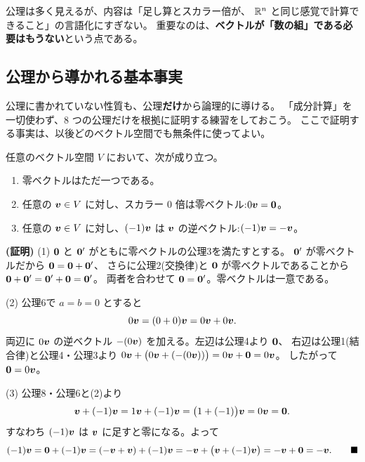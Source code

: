 公理は多く見えるが、内容は「足し算とスカラー倍が、
$\mathbb{R}^n$ と同じ感覚で計算できること」の言語化にすぎない。
重要なのは、\textbf{ベクトルが「数の組」である必要はもうない}という点である。

\subsection*{公理から導かれる基本事実}

公理に書かれていない性質も、公理\textbf{だけ}から論理的に導ける。
「成分計算」を一切使わず、$8$ つの公理だけを根拠に証明する練習をしておこう。
ここで証明する事実は、以後どのベクトル空間でも無条件に使ってよい。

\begin{teiri}[公理から導かれる基本事実]\label{thm:vs-basic}
任意のベクトル空間 $V$ において、次が成り立つ。
\begin{enumerate}
\item 零ベクトルはただ一つである。
\item 任意の $\bm{v} \in V$ に対し、スカラー $0$ 倍は零ベクトル:$0\bm{v} = \bm{0}$。
\item 任意の $\bm{v} \in V$ に対し、$(-1)\bm{v}$ は $\bm{v}$ の逆ベクトル:$(-1)\bm{v} = -\bm{v}$。
\end{enumerate}
\end{teiri}

\noindent\textbf{(証明)}\quad
(1) $\bm{0}$ と $\bm{0}'$ がともに零ベクトルの公理3を満たすとする。
$\bm{0}'$ が零ベクトルだから $\bm{0} = \bm{0} + \bm{0}'$、
さらに公理2(交換律)と $\bm{0}$ が零ベクトルであることから
$\bm{0} + \bm{0}' = \bm{0}' + \bm{0} = \bm{0}'$。
両者を合わせて $\bm{0} = \bm{0}'$。零ベクトルは一意である。

(2) 公理6で $a = b = 0$ とすると
\[
0\bm{v} = (0 + 0)\bm{v} = 0\bm{v} + 0\bm{v}.
\]
両辺に $0\bm{v}$ の逆ベクトル $-(0\bm{v})$ を加える。左辺は公理4より $\bm{0}$、
右辺は公理1(結合律)と公理4・公理3より
$0\bm{v} + \bigl(0\bm{v} + (-(0\bm{v}))\bigr) = 0\bm{v} + \bm{0} = 0\bm{v}$。
したがって $\bm{0} = 0\bm{v}$。

(3) 公理8・公理6と(2)より
\[
\bm{v} + (-1)\bm{v} = 1\bm{v} + (-1)\bm{v} = \bigl(1 + (-1)\bigr)\bm{v}
= 0\bm{v} = \bm{0}.
\]
すなわち $(-1)\bm{v}$ は $\bm{v}$ に足すと零になる。よって
\[
(-1)\bm{v} = \bm{0} + (-1)\bm{v} = (-\bm{v} + \bm{v}) + (-1)\bm{v}
= -\bm{v} + \bigl(\bm{v} + (-1)\bm{v}\bigr) = -\bm{v} + \bm{0} = -\bm{v}. \qquad\blacksquare
\]

